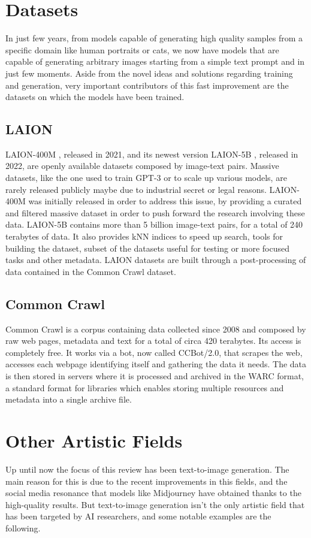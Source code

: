 \documentclass[conference]{IEEEtran}
\begin{document}
\section{Datasets}
In just few years, from models capable of generating high quality samples from a specific domain like human portraits or cats, we now have models that are capable of generating arbitrary images starting from a simple text prompt and in just few moments. Aside from the novel ideas and solutions regarding training and generation, very important contributors of this fast improvement are the datasets on which the models have been trained.
\subsection{LAION}
LAION-400M \cite{laion400m}, released in 2021, and its newest version LAION-5B \cite{laion5b}, released in 2022, are openly available datasets composed by image-text pairs. Massive datasets, like the one used to train GPT-3 or to scale up various models, are rarely released publicly maybe due to industrial secret or legal reasons. LAION-400M was initially released in order to address this issue, by providing a curated and filtered massive dataset in order to push forward the research involving these data. LAION-5B contains more than 5 billion image-text pairs, for a total of 240 terabytes of data. It also provides kNN indices to speed up search, tools for building the dataset, subset of the datasets useful for testing or more focused tasks and other metadata. LAION datasets are built through a post-processing of data contained in the Common Crawl dataset.
\subsection{Common Crawl}
Common Crawl \cite{commoncrawl} is a corpus containing data collected since 2008 and composed by raw web pages, metadata and text for a total of circa 420 terabytes. Its access is completely free. It works via a bot, now called CCBot/2.0, that scrapes the web, accesses each webpage identifying itself and gathering the data it needs. The data is then stored in servers where it is processed and archived in the WARC format, a standard format for libraries which enables storing multiple resources and metadata into a single archive file.
\pagebreak
\section{Other Artistic Fields}
Up until now the focus of this review has been text-to-image generation. The main reason for this is due to the recent improvements in this fields, and the social media resonance that models like Midjourney have obtained thanks to the high-quality results. But text-to-image generation isn't the only artistic field that has been targeted by AI researchers, and some notable examples are the following.
\end{document}
